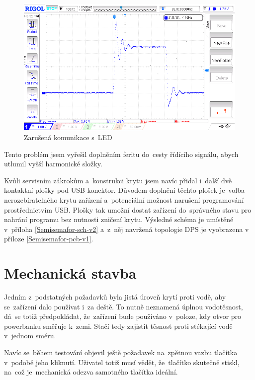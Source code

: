 \begin{figure}[!h]
  \begin{center}
    \includegraphics[width=\textwidth]{text/PraktickaCast/img/osci/fejk.png}
  \end{center}
  \caption{Zarušená komunikace s~LED}
  \label{Semisemafor-zvonek}
\end{figure}

Tento problém jsem vyřešil doplněním feritu do~cesty řídícího signálu, abych utlumil vyšší harmonické složky.

Kvůli servisním zákrokům a~konstrukci krytu jsem navíc přidal i~další dvě kontaktní plošky pod USB konektor.
Důvodem doplnění těchto plošek je~volba nerozebíratelného krytu zařízení a~potenciální možnost narušení programování prostřednictvím USB.
Plošky tak umožní dostat zařízení do~správného stavu pro nahrání programu bez nutnosti zničení krytu. 
Výsledné schéma je umístěné v~příloha \ref{Semisemafor-sch-v2} a~z~něj navržená topologie DPS je vyobrazena v příloze \ref{Semisemafor-pcb-v1}.

\section{Mechanická stavba}
Jedním z~podstatných požadavků byla jistá úroveň krytí proti vodě, aby se~zařízení dalo používat i~za deště.
To nutně neznamená úplnou vodotěsnost, dá~se totiž předpokládat, že~zařízení bude používáno v~poloze, kdy otvor pro powerbanku směřuje k~zemi.
Stačí tedy zajistit těsnost proti stékající vodě v~jednom směru.

Navíc se~během testování objevil ještě požadavek na~zpětnou vazbu tlačítka v~podobě jeho kliknutí. 
Uživatel totiž musí vědět, že~tlačítko skutečně stiskl, na~což je~mechanická odezva samotného tlačítka ideální.

